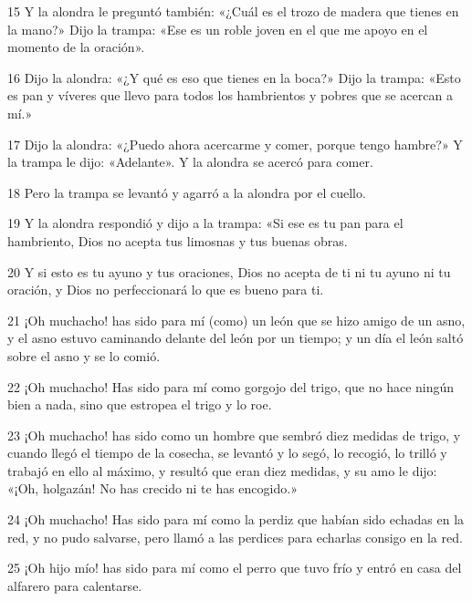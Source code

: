 \par 15 Y la alondra le preguntó también: «¿Cuál es el trozo de madera que tienes en la mano?» Dijo la trampa: «Ese es un roble joven en el que me apoyo en el momento de la oración».

\par 16 Dijo la alondra: «¿Y qué es eso que tienes en la boca?» Dijo la trampa: «Esto es pan y víveres que llevo para todos los hambrientos y pobres que se acercan a mí.»

\par 17 Dijo la alondra: «¿Puedo ahora acercarme y comer, porque tengo hambre?» Y la trampa le dijo: «Adelante». Y la alondra se acercó para comer.

\par 18 Pero la trampa se levantó y agarró a la alondra por el cuello.

\par 19 Y la alondra respondió y dijo a la trampa: «Si ese es tu pan para el hambriento, Dios no acepta tus limosnas y tus buenas obras.

\par 20 Y si esto es tu ayuno y tus oraciones, Dios no acepta de ti ni tu ayuno ni tu oración, y Dios no perfeccionará lo que es bueno para ti.

\par 21 ¡Oh muchacho! has sido para mí (como) un león que se hizo amigo de un asno, y el asno estuvo caminando delante del león por un tiempo; y un día el león saltó sobre el asno y se lo comió.

\par 22 ¡Oh muchacho! Has sido para mí como gorgojo del trigo, que no hace ningún bien a nada, sino que estropea el trigo y lo roe.

\par 23 ¡Oh muchacho! has sido como un hombre que sembró diez medidas de trigo, y cuando llegó el tiempo de la cosecha, se levantó y lo segó, lo recogió, lo trilló y trabajó en ello al máximo, y resultó que eran diez medidas, y su amo le dijo: «¡Oh, holgazán! No has crecido ni te has encogido.»

\par 24 ¡Oh muchacho! Has sido para mí como la perdiz que habían sido echadas en la red, y no pudo salvarse, pero llamó a las perdices para echarlas consigo en la red.

\par 25 ¡Oh hijo mío! has sido para mí como el perro que tuvo frío y entró en casa del alfarero para calentarse.

